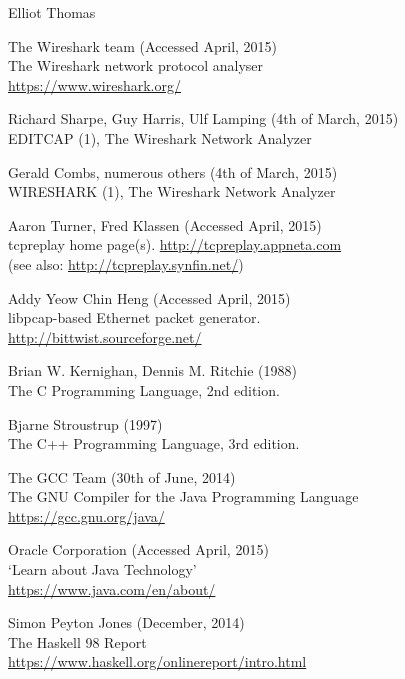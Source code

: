 \documentclass[10pt,a4paper,notitlepage]{report}
\begin{document}
\begin{center}
Elliot Thomas
\end{center}


\begin{thebibliography}{99}
	The Wireshark team (Accessed April, 2015)\\
	The Wireshark network protocol analyser\\
	\url{https://www.wireshark.org/}

    Richard Sharpe, Guy Harris, Ulf Lamping (4th of March, 2015)\\
    EDITCAP (1), The Wireshark Network Analyzer

    Gerald Combs, numerous others (4th of March, 2015)\\
    WIRESHARK (1), The Wireshark Network Analyzer

    Aaron Turner, Fred Klassen (Accessed April, 2015)\\
    tcpreplay home page(s).
    \url{http://tcpreplay.appneta.com}\\
    (see also: \url{http://tcpreplay.synfin.net/})

    Addy Yeow Chin Heng (Accessed April, 2015)\\
    libpcap-based Ethernet packet generator.\\
    \url{http://bittwist.sourceforge.net/}

	Brian W. Kernighan, Dennis M. Ritchie (1988)\\
	The C Programming Language, 2nd edition.

	Bjarne Stroustrup (1997)\\
	The C++ Programming Language, 3rd edition.

	The GCC Team (30th of June, 2014)\\
	The GNU Compiler for the Java Programming Language\\
	\url{https://gcc.gnu.org/java/}

	Oracle Corporation (Accessed April, 2015)\\
	`Learn about Java Technology'\\
	\url{https://www.java.com/en/about/}

    Simon Peyton Jones (December, 2014)\\
    The Haskell 98 Report\\
    \url{https://www.haskell.org/onlinereport/intro.html}


\end{thebibliography}
\end{document}
